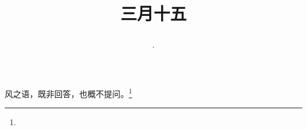 \title{\date[d=23,m=4,y=2024][year:cn-y,年,month:cn,day:cn,日,·,weekday]·三月十五 }
风之语，既非回答，也概不提问。\footnote{ }

